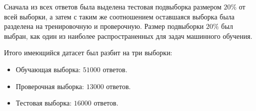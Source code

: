 \documentclass[../diploma.tex]{subfiles}
\begin{document}
	Сначала из всех ответов была выделена тестовая подвыборка размером $20 \%$ от всей выборки, 
	а затем с таким же соотношением оставшаяся выборка была разделена на тренировочную и проверочную.
	Размер подвыборки $20 \%$ был выбран, как один из наиболее распространенных для задач машинного обучения.

	Итого имеющийся датасет был разбит на три выборки:

	\begin{itemize}

		\item
		Обучающая выборка: $51000$ ответов.

		\item
		Проверочная выборка: $13000$ ответов.

		\item 
		Тестовая выборка: $16000$ ответов.

	\end{itemize}
	
\end{document}
